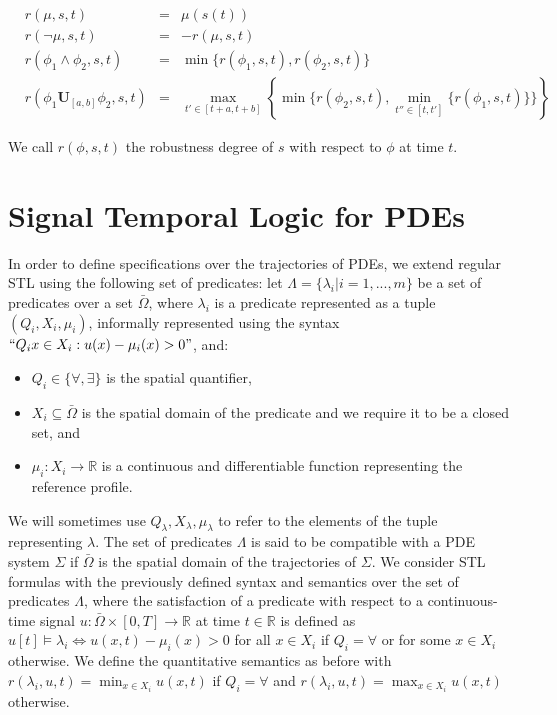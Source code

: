 \documentclass[oribibl]{llncs/llncs}
\newcommand*{\R}{\mathbb{R}}
\newcommand{\luntil}{\mathbf{U}}
\begin{document}
\begin{equation}
    \begin{aligned}
        &r(\mu, s, t) &= &\mu(s(t)) \\
        &r(\lnot \mu, s, t) &= &-r(\mu, s,t) \\
        &r(\phi_1 \land \phi_2, s, t) &= &\min\{r(\phi_1,s, t),
    r(\phi_2,s, t)\} \\
    &r(\phi_1 \luntil_{[a,b]} \phi_2,s, t) &= 
    &\max_{t' \in [t+a, t+b]} \left \{ \min\{ r(\phi_2,s, t), 
\min_{t'' \in [t, t']}\{r(\phi_1,s, t)\}\} \right \}
    \end{aligned}
\end{equation}

We call $r(\phi,s, t)$ the robustness degree of $s$ with respect to $\phi$ at
time $t$.

\section{Signal Temporal Logic for PDEs}
\label{sec:signal_temporal_logic_for_pdes}

In order to define specifications over the trajectories of PDEs, we extend
regular STL using the following set of predicates:
let $\Lambda = \{\lambda_i | i = 1,...,m\}$ be a set of predicates over
a set $\bar\Omega$, where $\lambda_i$ is a predicate represented as a tuple $(Q_i, X_i, \mu_i)$, 
informally represented using the syntax $``Q_i x \in X_i : u(x) - \mu_i(x) >
0"$, and:

\begin{itemize}
    \item $Q_i \in \{\forall, \exists\}$ is the spatial quantifier,
    \item $X_i \subseteq \bar\Omega$ is the spatial domain of the predicate and
        we require it to be a closed set, and 
    \item $\mu_i : X_i \to \R$ is a continuous and differentiable function 
        representing the reference profile.
\end{itemize}

We will sometimes use $Q_\lambda, X_\lambda, \mu_\lambda$ to refer to the
elements of the tuple representing $\lambda$. The set of predicates $\Lambda$ is
said to be compatible with a PDE system $\Sigma$ if $\bar\Omega$ is the spatial
domain of the trajectories of $\Sigma$. We consider STL formulas 
with the previously defined syntax and semantics 
over the set of predicates $\Lambda$, where the satisfaction of a
predicate with respect to a continuous-time signal $u : \bar\Omega \times [0, T]
\to \R$ at time $t \in \R$ is defined as $u[t] \models \lambda_i \iff 
u(x, t) - \mu_i(x) > 0$ for all $x \in X_i$ if $Q_i = \forall$ or for some $x \in
X_i$ otherwise. We define the quantitative semantics as before with
$r(\lambda_i,u, t) = \min_{x \in X_i} u(x, t)$ if $Q_i = \forall$ and
$r(\lambda_i,u, t) = \max_{x \in X_i} u(x, t)$ otherwise.
\end{document}
